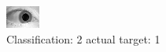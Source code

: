 \begin{figure}[h!]
\begin{center}
\includegraphics[width=0.60\columnwidth]{figures/ID1503_class_2_target_1.png}
\end{center}
\caption{ Classification: 2 actual target: 1}
\label{fig:ID1503_class_2_target_1}
\end{figure}

